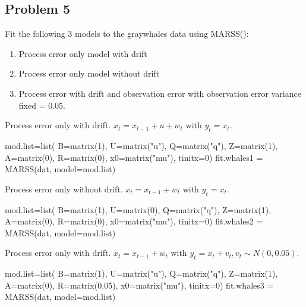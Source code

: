 \subsection*{Problem 5}
Fit the following 3 models to the graywhales data using MARSS(): 
\begin{enumerate}[label=\alph*.]
\item Process error only model with drift
\item Process error only model without drift
\item Process error with drift and observation error with observation error variance fixed = 0.05. 
\end{enumerate}
Process error only with drift. $x_t = x_{t-1} + u + w_t$ with $y_t = x_t$.
\begin{Schunk}
\begin{Sinput}
 mod.list=list(
   B=matrix(1), U=matrix("u"), Q=matrix("q"),
   Z=matrix(1), A=matrix(0), R=matrix(0),
   x0=matrix("mu"), tinitx=0)
 fit.whales1 = MARSS(dat, model=mod.list)
\end{Sinput}
\end{Schunk}
Process error only without drift. $x_t = x_{t-1} + w_t$ with $y_t = x_t$.
\begin{Schunk}
\begin{Sinput}
 mod.list=list(
   B=matrix(1), U=matrix(0), Q=matrix("q"),
   Z=matrix(1), A=matrix(0), R=matrix(0),
   x0=matrix("mu"), tinitx=0)
 fit.whales2 = MARSS(dat, model=mod.list)
\end{Sinput}
\end{Schunk}
Process error only with drift. $x_t = x_{t-1} + w_t$ with $y_t = x_t+v_t, v_t \sim N(0,0.05)$.
\begin{Schunk}
\begin{Sinput}
 mod.list=list(
   B=matrix(1), U=matrix("u"), Q=matrix("q"),
   Z=matrix(1), A=matrix(0), R=matrix(0.05),
   x0=matrix("mu"), tinitx=0)
 fit.whales3 = MARSS(dat, model=mod.list)
\end{Sinput}
\end{Schunk}
